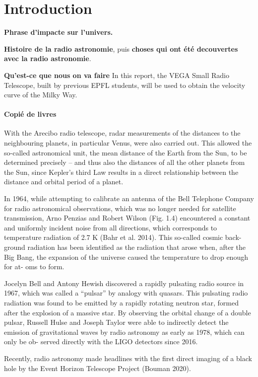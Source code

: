 \section{Introduction}
\textbf{Phrase d'impacte sur l'univers.}

\textbf{Histoire de la radio astronomie}, puis \textbf{choses qui ont été decouvertes avec la radio astronomie}.

\textbf{Qu'est-ce que nous on va faire}
In this report, the VEGA Small Radio Telescope, built by previous EPFL students, will be used to obtain the velocity curve of the Milky Way.

\paragraph{Copié de livres}
With the Arecibo radio telescope, radar measurements of the distances to the
neighbouring planets, in particular Venus, were also carried out. This allowed the
so-called astronomical unit, the mean distance of the Earth from the Sun, to be
determined precisely – and thus also the distances of all the other planets from the
Sun, since Kepler’s third Law results in a direct relationship between the distance
and orbital period of a planet.

In 1964, while attempting to calibrate an antenna of the Bell Telephone
Company for radio astronomical observations, which was no longer needed for
satellite transmission, Arno Penzias and Robert Wilson (Fig. 1.4) encountered a
constant and uniformly incident noise from all directions, which corresponds to
temperature radiation of 2.7 K (Bahr et al. 2014). This so-called cosmic back-
ground radiation has been identified as the radiation that arose when, after the Big
Bang, the expansion of the universe caused the temperature to drop enough for at-
oms to form.

Jocelyn Bell and Antony Hewish discovered a rapidly pulsating radio source in
1967, which was called a “pulsar” by analogy with quasars. This pulsating radio
radiation was found to be emitted by a rapidly rotating neutron star, formed after
the explosion of a massive star. By observing the orbital change of a double pulsar,
Russell Hulse and Joseph Taylor were able to indirectly detect the emission of
gravitational waves by radio astronomy as early as 1978, which can only be ob-
served directly with the LIGO detectors since 2016.

Recently, radio astronomy made headlines with the first direct imaging of a
black hole by the Event Horizon Telescope Project (Bouman 2020).

